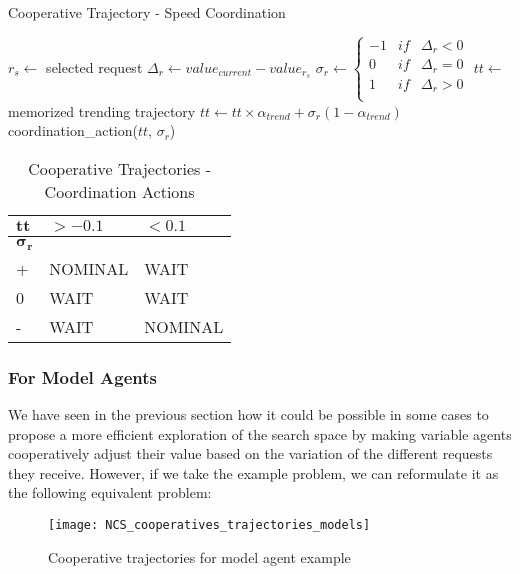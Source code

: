 \begin{algorithm}
\caption{Cooperative Trajectory - Speed Coordination}
\label{algo_speed_coordination}
	$r_s \leftarrow$ selected request\;
	\BlankLine
	$\Delta_r \leftarrow value_{current} - value_{r_{s}}$\;
	$\sigma_r \leftarrow \left\{
 									\begin{array}{rcr}
   									-1 & if &\Delta_r < 0 \\
   									0 & if &\Delta_r = 0\\
    								1 & if &\Delta_r > 0 \\
  								\end{array}
								\right.$\;
	\BlankLine
	$tt \leftarrow$ memorized trending trajectory\;
	$tt \leftarrow tt \times \alpha_{trend}	+ \sigma_r(1 - \alpha_{trend})$\;
	\BlankLine
	coordination_action($tt$, $\sigma_r$)	\;
\end{algorithm}

\begin{table}[htbp]
\caption{Cooperative Trajectories - Coordination Actions}\label{coord_act}
\centering
\begin{tabular}{l|ll}
		\toprule
		$\boldsymbol{tt}$&$>-  0.1 $ & $< 0.1 $\\
		\midrule
		$\boldsymbol{\sigma_r}$ &&\\
		+ & NOMINAL & WAIT\\
		0 & WAIT & WAIT\\
		- & WAIT & NOMINAL\\
		\bottomrule
\end{tabular}
\end{table}

\subsubsection{For Model Agents}

We have seen in the previous section how it could be possible in some cases to propose a more efficient exploration of the search space by making variable agents cooperatively adjust their value based on the variation of the different requests they receive. However, if we take the example problem, we can reformulate it as the following equivalent problem:

\begin{figure}
\centering
\texttt{[image: NCS\_cooperatives\_trajectories\_models]}
\caption{Cooperative trajectories for model agent example}\label{NCS_cooperatives_trajectories_models}
\end{figure}

